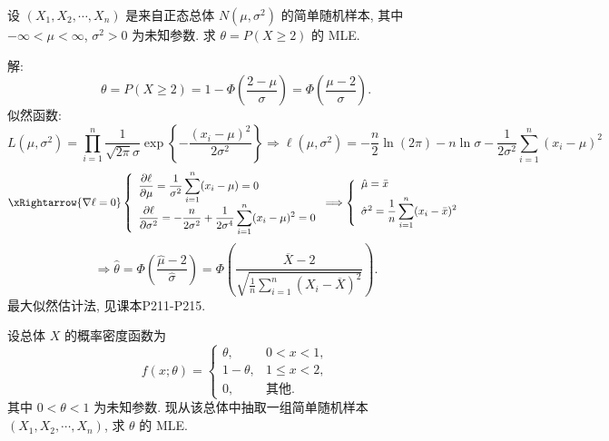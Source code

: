 \documentclass[standard]{ExBook}
\renewenvironment{shaded}{%
  \def\FrameCommand{\fboxsep=\FrameSep \colorbox{shadecolor}}%
  \MakeFramed{\advance\hsize-\width \FrameRestore}%
}{%
  \endMakeFramed
}
\begin{document}
\begin{qitems}
    \begin{bbox}
    \begin{shaded}
        \qitem
设 \((X_1, X_2, \cdots, X_n)\) 是来自正态总体 \(N(\mu, \sigma^2)\) 的简单随机样本, 其中 \(-\infty < \mu < \infty\), \(\sigma^2 > 0\) 为未知参数. 求 \(\theta = P(X \geq 2)\) 的 MLE.
    \end{shaded}
    \end{bbox}

\vspace{\dimexpr2.5cm-5em\relax}

解: 
$$
\theta=P(X\geq 2)
=1-\Phi\left(\frac{2-\mu}{\sigma}\right)
=\Phi\left(\frac{\mu-2}{\sigma}\right).
$$
似然函数:
$$
L(\mu,\sigma^2)
=\prod_{i=1}^{n}\frac{1}{\sqrt{2\pi}\sigma}
\exp\left\{-\frac{(x_i-\mu)^2}{2\sigma^2}\right\}
\Longrightarrow
\ell(\mu,\sigma^2)
=-\frac{n}{2}\ln(2\pi)-n\ln\sigma
-\frac{1}{2\sigma^2}\sum_{i=1}^{n}(x_i-\mu)^2
$$
$$
\xRightarrow{\nabla\ell=0}
\left\{
\begin{array}{l}
\displaystyle
\frac{\partial\ell}{\partial\mu}
=\frac{1}{\sigma^2}\sum\limits_{i=1}^{n}(x_i-\mu)=0\\[0.8em]
\displaystyle
\frac{\partial\ell}{\partial\sigma^2}
=-\frac{n}{2\sigma^2}
+\frac{1}{2\sigma^4}\sum\limits_{i=1}^{n}(x_i-\mu)^2=0
\end{array}
\right.
\Longrightarrow
\left\{
\begin{array}{l}
\hat{\mu}=\bar{x}\\[0.5em]
\hat{\sigma}^2=\displaystyle\frac{1}{n}\sum\limits_{i=1}^{n}(x_i-\bar{x})^2
\end{array}
\right.
$$
$$
\Longrightarrow
\hat{\theta}
=\Phi\left(\frac{\hat{\mu}-2}{\hat{\sigma}}\right)
=
\Phi\left(
\frac{\overline{X}-2}
{\sqrt{\frac{1}{n}\sum\limits_{i=1}^{n}(X_i-\overline{X})^2}}
\right).
$$
\textcolor{themeColor}{\selectfont {} 最大似然估计法, 见课本P211-P215.}

\vspace{2.5cm-5em}

    \begin{bbox}
    \begin{shaded}
        \qitem
设总体 \(X\) 的概率密度函数为
\[f(x; \theta) =
\begin{cases} 
\theta, & 0 < x < 1, \\
1 - \theta, & 1 \leq x < 2, \\
0, & \text{其他}.
\end{cases}\]
其中 \(0 < \theta < 1\) 为未知参数. 现从该总体中抽取一组简单随机样本 \((X_1, X_2, \cdots, X_n)\), 求 \(\theta\) 的 MLE.
    \end{shaded}
    \end{bbox}


\end{qitems}
\end{document}
